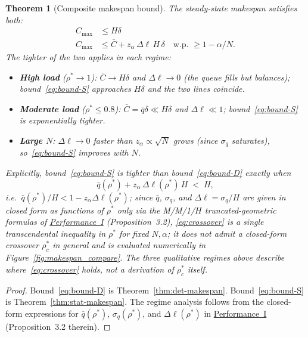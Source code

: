 \documentclass[11pt,a4paper]{report}
\newtheorem{theorem}{Theorem}[section]
\newcommand{\rhostar}{\rho^{*}}
\newcommand{\qbar}{\bar{q}}
\newcommand{\Dl}{\Delta\ell}
\newcommand{\Cmax}{C_{\max}}
\newcommand{\Cbar}{\bar{C}}
\newcommand{\sigmaq}{\sigma_q}
\begin{document}
\begin{theorem}[Composite makespan bound]
\label{thm:composite}
The steady-state makespan satisfies both:
\begin{align}
  \Cmax &\leq H\delta
  \tag{D} \label{eq:bound-D}\\
  \Cmax &\leq \Cbar + z_\alpha\,\Dl\,H\,\delta
  \quad \text{w.p. } \geq 1-\alpha/N.
  \tag{S} \label{eq:bound-S}
\end{align}
The tighter of the two applies in each regime:
\begin{itemize}
  \item \textbf{High load} ($\rhostar \to 1$): $\Cbar \to H\delta$ and $\Dl \to 0$
        (the queue fills but balances); bound~\eqref{eq:bound-S} approaches
        $H\delta$ and the two lines coincide.
  \item \textbf{Moderate load} ($\rhostar \leq 0.8$): $\Cbar = \qbar\delta \ll H\delta$
        and $\Dl \ll 1$; bound~\eqref{eq:bound-S} is exponentially tighter.
  \item \textbf{Large $N$}: $\Dl \to 0$ faster than $z_\alpha \propto \sqrt{N}$ grows
        (since $\sigmaq$ saturates), so~\eqref{eq:bound-S} improves with $N$.
\end{itemize}
Explicitly, bound~\eqref{eq:bound-S} is tighter than
bound~\eqref{eq:bound-D} exactly when
\begin{equation}\label{eq:crossover}
  \qbar(\rhostar) + z_\alpha\,\Dl(\rhostar)\,H
  \;<\; H,
\end{equation}
i.e.\ $\qbar(\rhostar)/H < 1 - z_\alpha \Dl(\rhostar)$; since
$\qbar$, $\sigma_q$, and $\Dl = \sigma_q/H$ are given in closed form as
functions of $\rhostar$ only via the M/M/1/$H$ truncated-geometric
formulas of \hyperref[chap:load_balance]{Performance~I} (Proposition~3.2),
\eqref{eq:crossover} is a single transcendental inequality in $\rhostar$
for fixed $N, \alpha$; it does not admit a closed-form crossover
$\rhostar_c$ in general and is evaluated numerically in
Figure~\ref{fig:makespan_compare}. The three qualitative regimes
above describe where~\eqref{eq:crossover} holds, not a derivation of
$\rhostar_c$ itself.
\end{theorem}

\begin{proof}
Bound~\eqref{eq:bound-D} is Theorem~\ref{thm:det-makespan}.
Bound~\eqref{eq:bound-S} is Theorem~\ref{thm:stat-makespan}.
The regime analysis follows from the closed-form expressions for
$\qbar(\rhostar)$, $\sigmaq(\rhostar)$, and $\Dl(\rhostar)$ in
\hyperref[chap:load_balance]{Performance~I} (Proposition~3.2 therein).
\end{proof}
\end{document}
